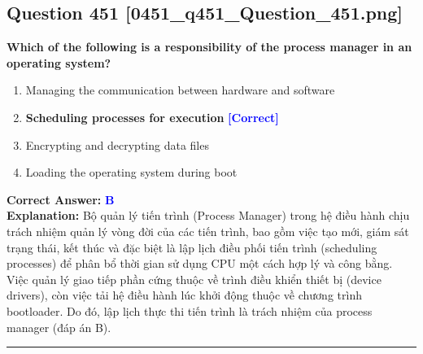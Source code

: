\documentclass[11pt,a4paper]{article}
\begin{document}
\begin{minipage}{\textwidth}
\subsection*{Question 451 \quad \footnotesize{[0451\_q451\_Question\_451.png]}}
\noindent \textbf{Which of the following is a responsibility of the process manager in an operating system?}

\begin{enumerate}[label=\Alph*.]
    \item Managing the communication between hardware and software
    \item \textbf{Scheduling processes for execution} \hfill \textcolor{blue}{\textbf{[Correct]}}
    \item Encrypting and decrypting data files
    \item Loading the operating system during boot
\end{enumerate}

\noindent \textbf{Correct Answer:} \textcolor{blue}{\textbf{B}} \\[2pt]
\noindent \textbf{Explanation:} Bộ quản lý tiến trình (Process Manager) trong hệ điều hành chịu trách nhiệm quản lý vòng đời của các tiến trình, bao gồm việc tạo mới, giám sát trạng thái, kết thúc và đặc biệt là lập lịch điều phối tiến trình (scheduling processes) để phân bổ thời gian sử dụng CPU một cách hợp lý và công bằng. Việc quản lý giao tiếp phần cứng thuộc về trình điều khiển thiết bị (device drivers), còn việc tải hệ điều hành lúc khởi động thuộc về chương trình bootloader. Do đó, lập lịch thực thi tiến trình là trách nhiệm của process manager (đáp án B).

\par\vspace{0.3cm}
\hrule
\vspace{0.3cm}
\end{minipage}
\end{document}
